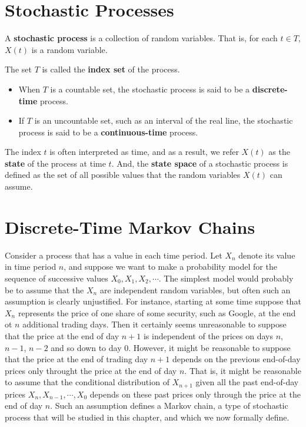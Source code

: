 \section{Stochastic Processes}

\begin{definition}
    A \textbf{stochastic process} is a collection of random variables. That is, for each $t \in T$, $X(t)$ is a random variable.
\end{definition}

\begin{remark}
    The set $T$ is called the \textbf{index set} of the process.
    \begin{itemize}
        \item When $T$ is a countable set, the stochastic process is said to be a \textbf{discrete-time} process. 
        \item If $T$ is an uncountable set, such as an interval of the real line, the stochastic process is said to be a \textbf{continuous-time} process.
    \end{itemize}
\end{remark}

\begin{remark}
    The index $t$ is often interpreted as time, and as a result, we refer $X(t)$ as the \textbf{state} of the process at time $t$. And, the \textbf{state space} of a stochastic process is defined as the set of all possible values that the random variables $X(t)$ can assume.
\end{remark}




\section{Discrete-Time Markov Chains}

Consider a process that has a value in each time period. Let $X_n$ denote its value in time period $n$, and suppose we want to make a probability model for the sequence of successive values $X_0, X_1, X_2, \cdots$. The simplest model would probably be to assume that the $X_n$ are independent random variables, but often such an assumption is clearly unjustified. For instance, starting at some time suppose that $X_n$ represents the price of one share of some security, such as Google, at the end ot $n$ additional trading days. Then it certainly seems unreasonable to suppose that the price at the end of day $n+1$ is independent of the prices on days $n$, $n-1$, $n-2$ and so down to day $0$. However, it might be reasonable to suppose that the price at the end of trading day $n+1$ depends on the previous end-of-day prices only throught the price at the end of day $n$. That is, it might be reasonable to assume that the conditional distribution of $X_{n+1}$ given all the past end-of-day prices $X_n, X_{n-1}, \cdots, X_0$ depends on these past prices only through the price at the end of day $n$. Such an assumption defines a Markov chain, a type of stochastic process that will be studied in this chapter, and which we now formally define.


